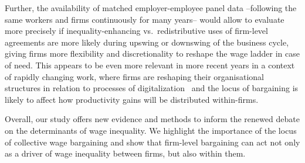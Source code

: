 \documentclass[12pt]{article}
\begin{document}
Further, the availability of matched employer-employee panel data --following the same workers and firms continuously for many years-- would allow to evaluate more precisely if inequality-enhancing vs.~redistributive uses of firm-level agreements are more likely during upswing or downswing of the business cycle, giving firms more flexibility and discretionality to reshape the wage ladder in case of need. This appears to be even more relevant in more recent years in a context of rapidly changing work, where firms are reshaping their organisational structures in relation to processes of digitalization~\citep{OECD2019} and the locus of bargaining is likely to affect how productivity gains will be distributed within-firms.

Overall, our study offers new evidence and methods to inform the renewed debate on the determinants of wage inequality. We highlight the importance of the locus of collective wage bargaining and show that firm-level bargaining can act not only as a driver of wage inequality between firms, but also within them.

\clearpage
\theendnotes
\end{document}
